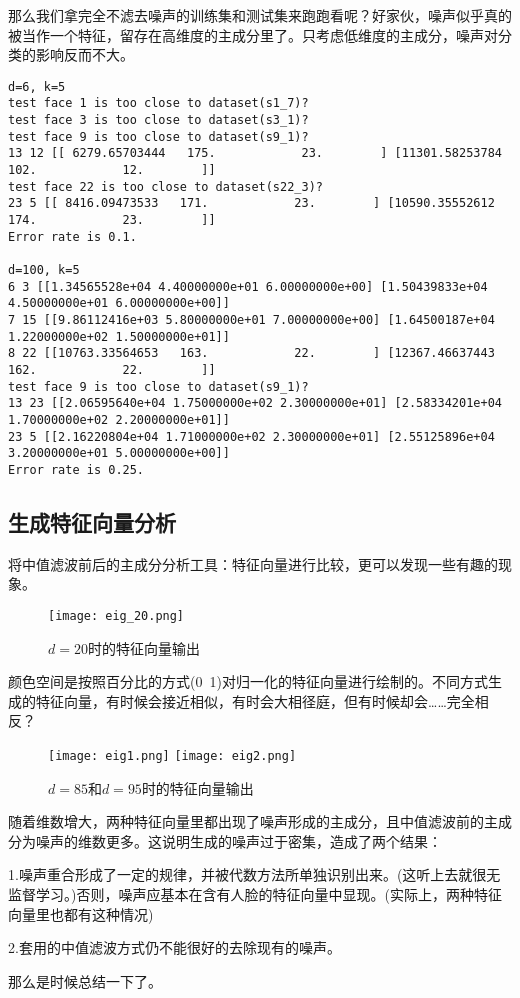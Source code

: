 那么我们拿完全不滤去噪声的训练集和测试集来跑跑看呢？好家伙，噪声似乎真的被当作一个特征，留存在高维度的主成分里了。只考虑低维度的主成分，噪声对分类的影响反而不大。

\begin{verbatim}
d=6, k=5
test face 1 is too close to dataset(s1_7)?
test face 3 is too close to dataset(s3_1)?
test face 9 is too close to dataset(s9_1)?
13 12 [[ 6279.65703444   175.            23.        ] [11301.58253784   102.            12.        ]]
test face 22 is too close to dataset(s22_3)?
23 5 [[ 8416.09473533   171.            23.        ] [10590.35552612   174.            23.        ]]
Error rate is 0.1.

d=100, k=5
6 3 [[1.34565528e+04 4.40000000e+01 6.00000000e+00] [1.50439833e+04 4.50000000e+01 6.00000000e+00]]
7 15 [[9.86112416e+03 5.80000000e+01 7.00000000e+00] [1.64500187e+04 1.22000000e+02 1.50000000e+01]]
8 22 [[10763.33564653   163.            22.        ] [12367.46637443   162.            22.        ]]
test face 9 is too close to dataset(s9_1)?
13 23 [[2.06595640e+04 1.75000000e+02 2.30000000e+01] [2.58334201e+04 1.70000000e+02 2.20000000e+01]]
23 5 [[2.16220804e+04 1.71000000e+02 2.30000000e+01] [2.55125896e+04 3.20000000e+01 5.00000000e+00]]
Error rate is 0.25.
\end{verbatim}

\subsection{生成特征向量分析}
\label{sec:eig}

将中值滤波前后的主成分分析工具：特征向量进行比较，更可以发现一些有趣的现象。

\begin{figure}[H]
    \centering
    \texttt{[image: eig\_20.png]}
    \caption{$d=20$时的特征向量输出}
    \label{fig:eig_20}
\end{figure}

颜色空间是按照百分比的方式(0~1)对归一化的特征向量进行绘制的。不同方式生成的特征向量，有时候会接近相似，有时会大相径庭，但有时候却会……完全相反？

\begin{figure}[H]
    \centering
    \texttt{[image: eig1.png]}
    \texttt{[image: eig2.png]}
    \caption{$d=85$和$d=95$时的特征向量输出}
    \label{fig:eig}
\end{figure}

随着维数增大，两种特征向量里都出现了噪声形成的主成分，且中值滤波前的主成分为噪声的维数更多。这说明生成的噪声过于密集，造成了两个结果：

1.噪声重合形成了一定的规律，并被代数方法所单独识别出来。(这听上去就很无监督学习。)否则，噪声应基本在含有人脸的特征向量中显现。(实际上，两种特征向量里也都有这种情况)

2.套用的中值滤波方式仍不能很好的去除现有的噪声。

那么是时候总结一下了。